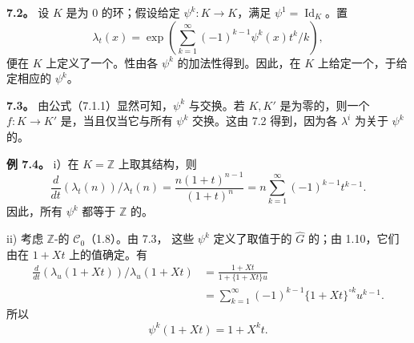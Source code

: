 \textbf{7.2。} 设 $K$ 是为 $0$ 的环；假设给定 $\psi^k:K\longrightarrow K$，满足 $\psi^1=\operatorname{Id}_K$。置
\[
\lambda_t(x)=\exp\left(\sum_{k=1}^{\infty}
 (-1)^{k-1}\psi^k(x)t^k/k\right),
\tag{7.2.1}
\]
便在 $K$ 上定义了一个。性由各 $\psi^k$ 的加法性得到。因此，在 $K$ 上给定一个，于给定相应的 $\psi^k$。

\textbf{7.3。} 由公式（7.1.1）显然可知，$\psi^k$ 与交换。若 $K,K'$ 是为零的，则一个 $f:K\longrightarrow K'$ 是，当且仅当它与所有 $\psi^k$ 交换。这由 7.2 得到，因为各 $\lambda^i$ 为关于 $\psi^k$ 的。

\textbf{例 7.4。} i）在 $K=\mathbb Z$ 上取其结构，则
\[
\frac{d}{dt}(\lambda_t(n))/\lambda_t(n)
 =\frac{n(1+t)^{n-1}}{(1+t)^n}
 =n\sum_{k=1}^{\infty}(-1)^{k-1}t^{k-1}.
\]
因此，所有 $\psi^k$ 都等于 $\mathbb Z$ 的。

\textup{ii)} 考虑 $\mathbb Z$-的 $\mathscr C_0$（1.8）。由 7.3，
这些 $\psi^k$ 定义了取值于的 $\widehat G$ 的；由 1.10，它们由在 $1+Xt$ 上的值确定。有
\[
\begin{aligned}
\frac{d}{dt}(\lambda_u(1+Xt))/\lambda_u(1+Xt)
 &=\frac{1+Xt}{1+\{1+Xt\}u}\\
 &=\sum_{k=1}^{\infty}(-1)^{k-1}
 \{1+Xt\}^{\circ k}u^{k-1}.
\end{aligned}
\]
所以
\[
\psi^k(1+Xt)=1+X^kt.
\tag{7.4.1}
\]

